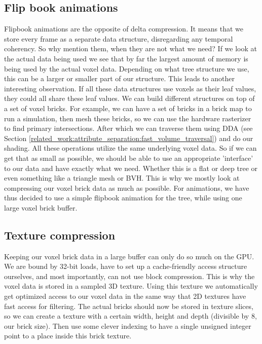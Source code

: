 \subsection{Flip book animations} \label{approach:flipbook_animations}
Flipbook animations are the opposite of delta compression. It means that we store every frame as a separate data structure, disregarding any temporal coherency. So why mention them, when they are not what we need? If we look at the actual data being used we see that by far the largest amount of memory is being used by the actual voxel data. Depending on what tree structure we use, this can be a larger or smaller part of our structure. This leads to another interesting observation. If all these data structures use voxels as their leaf values, they could all share these leaf values. We can build different structures on top of a set of voxel bricks. For example, we can have a set of bricks in a brick map to run a simulation, then mesh these bricks, so we can use the hardware rasterizer to find primary intersections. After which we can traverse them using DDA (see Section \ref{related_work:attribute_separation:fast_volume_traversal}) and do our shading. All these operations utilize the same underlying voxel data. So if we can get that as small as possible, we should be able to use an appropriate 'interface' to our data and have exactly what we need. Whether this is a flat or deep tree or even something like a triangle mesh or BVH. This is why we mostly look at compressing our voxel brick data as much as possible. For animations, we have thus decided to use a simple flipbook animation for the tree, while using one large voxel brick buffer.

\subsection{Texture compression} \label{approach:texture_compression}
Keeping our voxel brick data in a large buffer can only do so much on the GPU. We are bound by 32-bit loads, have to set up a cache-friendly access structure ourselves, and most importantly, can not use block compression. This is why the voxel data is stored in a sampled 3D texture. Using this texture we automatically get optimized access to our voxel data in the same way that 2D textures have fast access for filtering. The actual bricks should now be stored in texture slices, so we can create a texture with a certain width, height and depth (divisible by 8, our brick size). Then use some clever indexing to have a single unsigned integer point to a place inside this brick texture.


